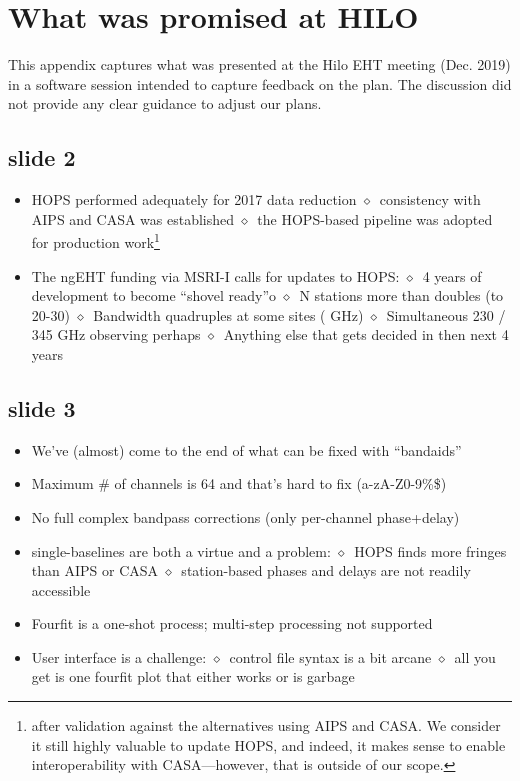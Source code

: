 %
%
\section{What was promised at HILO}
\label{sec:hilo}

This appendix captures what was presented at the Hilo
EHT meeting (Dec. 2019) in a software session intended to
capture feedback on the plan.  The discussion
did not provide any clear guidance to adjust our plans.

\newcommand{\sbitem}{\hfill\break\hspace{2mm}$\diamond$\ }

\subsection{slide 2}
\begin{itemize}
\item HOPS performed adequately for 2017 data reduction
\sbitem consistency with AIPS and CASA was established
\sbitem the HOPS-based pipeline was adopted for production work\footnote{%
after validation against the alternatives using AIPS and CASA.
We consider it still highly valuable to update \ac{HOPS}, and indeed, it
makes sense to enable interoperability with CASA---however, that is outside
of our scope.}
\item The ngEHT funding via MSRI-I calls for updates to HOPS:
\sbitem 4 years of development to become “shovel ready”o
\sbitem N stations more than doubles (\eg to 20-30)
\sbitem Bandwidth quadruples at some sites ( GHz)
\sbitem Simultaneous 230 / 345 GHz observing perhaps
\sbitem Anything else that gets decided in then next 4 years
\end{itemize}

\subsection{slide 3}
\begin{itemize}
\item We’ve (almost) come to the end of what can be fixed with “bandaids”
\item Maximum \# of channels is 64 and that’s hard to fix (a-zA-Z0-9\%\$)
\item No full complex bandpass corrections (only per-channel phase+delay)
\item single-baselines are both a virtue and a problem:
\sbitem HOPS finds more fringes than AIPS or CASA
\sbitem station-based phases and delays are not readily accessible
\item Fourfit is a one-shot process; multi-step processing not supported
\item User interface is a challenge:
\sbitem control file syntax is a bit arcane
\sbitem all you get is one fourfit plot that either works or is garbage
\end{itemize}


